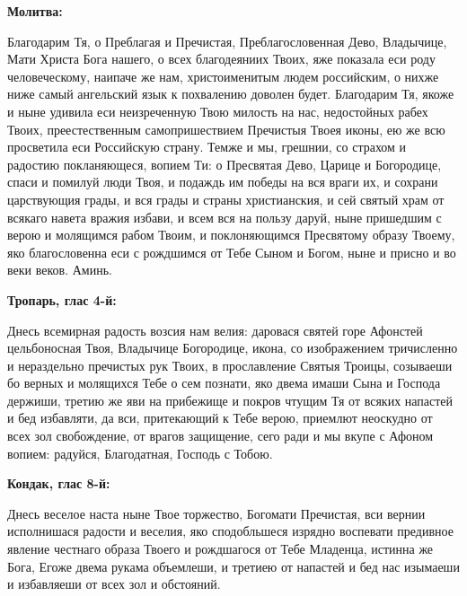 \medskip


\bfseries Молитва:\normalfont{}\nopagebreak


Благодарим Тя, о Преблагая и Пречистая, Преблагословенная Дево, Владычице, Мати Христа Бога нашего, о всех благодеяниих Твоих, яже показала еси роду человеческому, наипаче же нам, христоименитым людем российским, о нихже ниже самый ангельский язык к похвалению доволен будет. Благодарим Тя, якоже и ныне удивила еси неизреченную Твою милость на нас, недостойных рабех Твоих, преестественным самопришествием Пречистыя Твоея иконы, ею же всю просветила еси Российскую страну. Темже и мы, грешнии, со страхом и радостию покланяющеся, вопием Ти: о Пресвятая Дево, Царице и Богородице, спаси и помилуй люди Твоя, и подаждь им победы на вся враги их, и сохрани царствующия грады, и вся грады и страны христианския, и сей святый храм от всякаго навета вражия избави, и всем вся на пользу даруй, ныне пришедшим с верою и молящимся рабом Твоим, и поклоняющимся Пресвятому образу Твоему, яко благословенна еси с рождшимся от Тебе Сыном и Богом, ныне и присно и во веки веков. Аминь.
\nopagebreak\bigskip\bigskip\mychapterending

 


\bfseries Тропарь, глас 4-й:\normalfont{}\nopagebreak


Днесь всемирная радость возсия нам велия: даровася святей горе Афонстей цельбоносная Твоя, Владычице Богородице, икона, со изображением тричисленно и нераздельно пречистых рук Твоих, в прославление Святыя Троицы, созываеши бо верных и молящихся Тебе о сем познати, яко двема имаши Сына и Господа держиши, третию же яви на прибежище и покров чтущим Тя от всяких напастей и бед избавляти, да вси, притекающий к Тебе верою, приемлют неоскудно от всех зол свобождение, от врагов защищение, сего ради и мы вкупе с Афоном вопием: радуйся, Благодатная, Господь с Тобою. 


\medskip


\bfseries Кондак, глас 8-й:\normalfont{}\nopagebreak


Днесь веселое наста ныне Твое торжество, Богомати Пречистая, вси вернии исполнишася радости и веселия, яко сподобльшеся изрядно воспевати предивное явление честнаго образа Твоего и рождшагося от Тебе Младенца, истинна же Бога, Егоже двема рукама объемлеши, и третиею от напастей и бед нас изымаеши и избавляеши от всех зол и обстояний.


